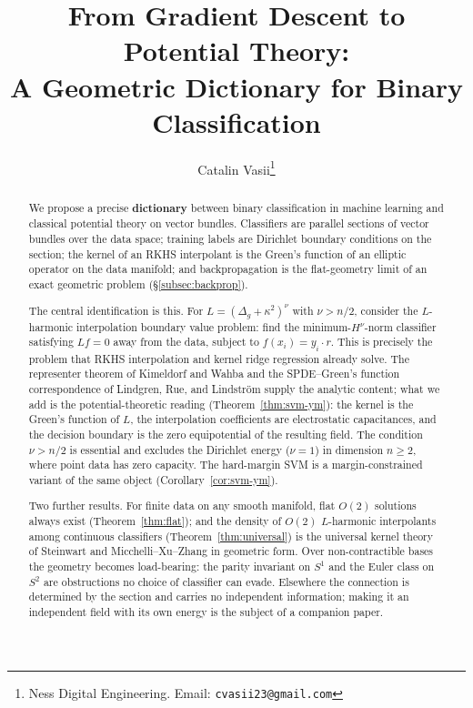 \documentclass[11pt, a4paper]{article}
\theoremstyle{plain}
\theoremstyle{definition}
\begin{document}

\title{From Gradient Descent to Potential Theory:\\
A Geometric Dictionary for Binary Classification}

\author{Catalin Vasii\thanks{Ness Digital Engineering.
Email: \texttt{cvasii23@gmail.com}}}

\date{}

\maketitle

\begin{abstract}
We propose a precise \textbf{dictionary} between binary classification in machine
learning and classical potential theory on vector bundles. Classifiers are
parallel sections of vector bundles over the data space; training labels are
Dirichlet boundary conditions on the section; the kernel of an RKHS interpolant
is the Green's function of an elliptic operator on the data manifold; and
backpropagation is the flat-geometry limit of an exact geometric problem
(\S\ref{subsec:backprop}).

The central identification is this. For $L = (\Delta_g + \kappa^2)^\nu$ with
$\nu > n/2$, consider the $L$-harmonic interpolation boundary value problem:
find the minimum-$H^\nu$-norm classifier satisfying $Lf = 0$ away from the data,
subject to $f(x_i) = y_i \cdot r$. This is precisely the problem that RKHS
interpolation and kernel ridge regression already solve. The representer theorem
of Kimeldorf and Wahba \cite{kimeldorf1971some} and the SPDE--Green's function
correspondence of Lindgren, Rue, and Lindstr\"om \cite{lindgren2011spde} supply
the analytic content; what we add is the potential-theoretic reading
(Theorem~\ref{thm:svm-ym}): the kernel is the Green's function of $L$, the
interpolation coefficients are electrostatic capacitances, and the decision
boundary is the zero equipotential of the resulting field. The condition
$\nu > n/2$ is essential and excludes the Dirichlet energy ($\nu = 1$) in
dimension $n \geq 2$, where point data has zero capacity. The hard-margin SVM is
a margin-constrained variant of the same object (Corollary~\ref{cor:svm-ym}).

Two further results. For finite data on any smooth manifold, flat $O(2)$
solutions always exist (Theorem~\ref{thm:flat}); and the density of $O(2)$
$L$-harmonic interpolants among continuous classifiers
(Theorem~\ref{thm:universal}) is the universal kernel theory of Steinwart
\cite{steinwart2001} and Micchelli--Xu--Zhang \cite{micchelli2006} in geometric
form. Over non-contractible bases the geometry becomes load-bearing: the parity
invariant on $S^1$ and the Euler class on $S^2$ are obstructions no choice of
classifier can evade. Elsewhere the connection is determined by the section and
carries no independent information; making it an independent field with its own
energy is the subject of a companion paper.
\end{abstract}
\end{document}
